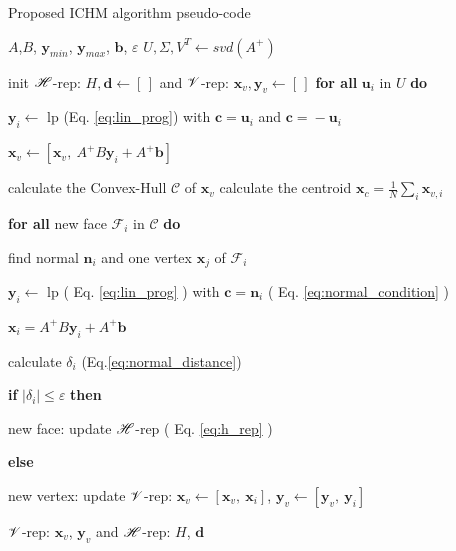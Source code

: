 \begin{algorithm}[!b]
\caption{Proposed ICHM algorithm pseudo-code}
\begin{algorithmic}
\REQUIRE $A$,$B$, $\bm{y}_{min}$, $\bm{y}_{max}$, $\bm{b}$, $\varepsilon$
\STATE $U, \Sigma, V^T \leftarrow svd(A^+)$ 

\STATE init $\mathscr{H}$-rep: $H,\bm{d} \leftarrow [\,]$ and $\mathscr{V}$-rep: $\bm{x}_v,\bm{y}_v\leftarrow [\,]$
\STATE \textbf{for all}   {$\bm{u}_i$ in $U$} \textbf{do}

\hspace{0.3cm} $\bm{y}_{i}\leftarrow$ \gls{lp} (Eq. \ref{eq:lin_prog}) with $\bm{c}\! =\! \bm{u}_i$ and $\bm{c}\! =\! -\bm{u}_i$

\hspace{0.3cm} $\bm{x}_{v} \leftarrow [\bm{x}_{v}, ~ A^+B\bm{y}_i + A^+\bm{b}]$

\REPEAT

\STATE calculate the Convex-Hull $\mathcal{C}$ of $\bm{x}_{v}$
\STATE calculate the centroid $\bm{x}_{c} = \frac{1}{N}\sum_i\bm{x}_{v,i}$

\STATE \textbf{for all}   {new face $\mathcal{F}_i$ in $\mathcal{C}$} \textbf{do}

\hspace{0.25cm} find normal $\bm{n}_i$ and one vertex $\bm{x}_{j}$ of $\mathcal{F}_i$

\hspace{0.25cm} $\bm{y}_{i}\leftarrow$ \gls{lp} ( Eq. \ref{eq:lin_prog} ) with  $\bm{c}\! =\! \bm{n}_i$ ( Eq. \ref{eq:normal_condition} )

\hspace{0.25cm} $\bm{x}_{i} = A^+B\bm{y}_i+A^+\bm{b}$ 

\hspace{0.25cm}  calculate $\delta_i$ (Eq.\ref{eq:normal_distance})

\hspace{0.25cm}  \textbf{if}   $ |\delta_i| \leq \varepsilon$ \textbf{then} 

\hspace{0.6cm}  new face: update $\mathscr{H}$-rep  ( Eq. \ref{eq:h_rep} )

\hspace{0.25cm}  \textbf{else}

\hspace{0.6cm} new vertex: update $\mathscr{V}$-rep: $\bm{x}_{v} \!\leftarrow\! [\bm{x}_{v},~ \bm{x}_i ]$,  $\bm{y}_{v} \!\leftarrow\! [\bm{y}_{v},~ \bm{y}_i ]$ 

{}
\RETURN  $\mathscr{V}$-rep: $\bm{x}_v$, $\bm{y}_v$ and  $\mathscr{H}$-rep: $H$, $\bm{d}$ 
\end{algorithmic}
\label{alg:algo_2}
\end{algorithm}

